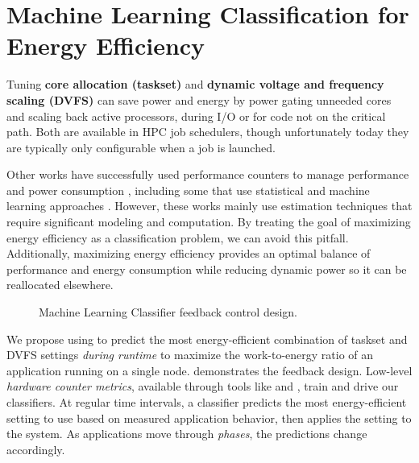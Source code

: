 
\section{Machine Learning Classification for Energy Efficiency}

Tuning \textbf{core allocation (taskset)} and \textbf{dynamic voltage and frequency scaling (DVFS)} can save power and energy by power gating unneeded cores and scaling back active processors, \eg during I/O or for code not on the critical path.
Both are available in HPC job schedulers, though unfortunately today they are typically only configurable when a job is launched.

Other works have successfully used performance counters to manage performance and power consumption \cite{WuHPCComputer,Chetsa,Libutti2014}, including some that use statistical and machine learning approaches \cite{Sasaki,ShyeIDVFS,Alvarado,Curtis-Maury2008,LiIPDPS2010}.
However, these works mainly use estimation techniques that require significant modeling and computation.
By treating the goal of maximizing energy efficiency as a classification problem, we can avoid this pitfall.
Additionally, maximizing energy efficiency provides an optimal balance of performance and energy consumption while reducing dynamic power so it can be reallocated elsewhere.

\begin{figure}[t]
  
  \caption{Machine Learning Classifier feedback control design.}
  \label{fig:runtime-ee}
\end{figure}

We propose using  to predict the most energy-efficient combination of taskset and DVFS settings \emph{during runtime} to maximize the work-to-energy ratio of an application running on a single node.
 demonstrates the feedback design.
Low-level \emph{hardware counter metrics}, available through tools like  and , train and drive our classifiers.
At regular time intervals, a classifier predicts the most energy-efficient setting to use based on measured application behavior, then applies the setting to the system.
As applications move through \emph{phases}, the predictions change accordingly.

